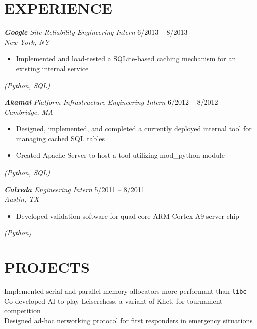 \documentclass[margin]{res}
\begin{document}
\begin{resume}
\section{EXPERIENCE} 
                    {\sl{\bf Google} Site Reliability Engineering Intern} 
                    \hfill 6/2013 -- 8/2013 \\
                    {\sl  New York, NY}
                    \begin{itemize} \itemsep -2pt %
                        \setlength{\topsep}{0pt}
                         \item Implemented and load-tested a SQLite-based
                           caching mechanism for an existing internal service
                    \end{itemize} 
                    \vspace{-4.5mm} {\sl (Python, SQL)}

                    {\sl {\bf Akamai} 
                      Platform Infrastructure Engineering Intern} 
                    \hfill 6/2012 -- 8/2012 \\
                    {\sl Cambridge, MA}
                    \begin{itemize} \itemsep -2pt %
                         \item Designed, implemented, and completed a 
                           currently deployed internal tool for managing cached 
                           SQL tables
                         \item Created Apache Server to host a tool utilizing 
                           mod\_python module 
                    \end{itemize}
                    \vspace{-4.5mm} {\sl (Python, SQL)}

                    {\sl {\bf Calxeda} Engineering Intern} 
                    \hfill 5/2011 -- 8/2011 \\
                    {\sl Austin, TX}
                    \begin{itemize} \itemsep -2pt %
                          \item Developed validation software for quad-core ARM 
                            Cortex-A9 server chip
                    \end{itemize}
                    \vspace{-4.5mm} {\sl (Python)}

\section{PROJECTS}  Implemented serial and parallel memory allocators more
                      performant than \texttt{libc} \\
                    Co-developed AI to play Leiserchess, a variant of Khet, for 
                      tournament competition \\
                    Designed ad-hoc networking protocol for first responders in
                      emergency situations
 

\end{resume}
\end{document}
